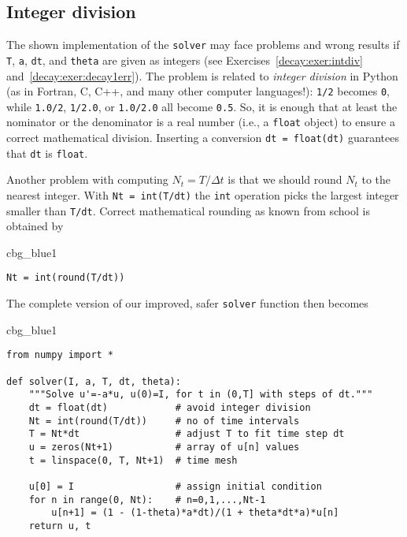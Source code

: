\documentclass[graybox,sectrefs,envcountresetchap,open=right,final]{svmonodo}
\newenvironment{_cod_tight}[1]{
   \def\FrameCommand{\colorbox{#1}}
   \FrameRule0.6pt\MakeFramed {\FrameRestore}\vskip3mm}
   {\vskip0mm\endMakeFramed}
\newenvironment{cod}[1]{
\bgroup\rmfamily
\fboxsep=0mm\relax
\begin{_cod_tight}{#1}
\list{}{\parsep=-2mm\parskip=0mm\topsep=0pt\leftmargin=2mm
\rightmargin=2\leftmargin\leftmargin=4pt\relax}
\item\relax}
{\endlist\end{_cod_tight}\egroup}
\begin{document}
\subsection{Integer division}
\label{decay:py2}

The shown implementation of the \texttt{solver} may face problems and
wrong results if \texttt{T}, \texttt{a}, \texttt{dt}, and \texttt{theta} are given as integers
(see Exercises~\ref{decay:exer:intdiv} and~\ref{decay:exer:decay1err}).
The problem is related to \emph{integer division} in Python (as
in Fortran, C, C++, and many other computer languages!): \texttt{1/2} becomes \texttt{0},
while \texttt{1.0/2}, \texttt{1/2.0}, or \texttt{1.0/2.0} all become \texttt{0.5}. So, it is enough
that at least the nominator or the denominator is a real number
(i.e., a \texttt{float} object)
to ensure a correct mathematical division. Inserting
a conversion \texttt{dt = float(dt)}
guarantees that \texttt{dt} is
\texttt{float}.

Another problem with computing $N_t=T/\Delta t$ is that we should
round $N_t$ to the nearest integer. With \texttt{Nt = int(T/dt)} the \texttt{int}
operation picks the largest integer smaller than \texttt{T/dt}. Correct
mathematical rounding as known from school is obtained by
\begin{cod}{cbg_blue1}\begin{Verbatim}[numbers=none,fontsize=\fontsize{9pt}{9pt},baselinestretch=0.95,xleftmargin=2mm]
Nt = int(round(T/dt))
\end{Verbatim}
\end{cod}
\noindent
The complete version of our improved, safer \texttt{solver} function then becomes

\begin{cod}{cbg_blue1}\begin{Verbatim}[numbers=none,fontsize=\fontsize{9pt}{9pt},baselinestretch=0.95,xleftmargin=2mm]
from numpy import *

def solver(I, a, T, dt, theta):
    """Solve u'=-a*u, u(0)=I, for t in (0,T] with steps of dt."""
    dt = float(dt)            # avoid integer division
    Nt = int(round(T/dt))     # no of time intervals
    T = Nt*dt                 # adjust T to fit time step dt
    u = zeros(Nt+1)           # array of u[n] values
    t = linspace(0, T, Nt+1)  # time mesh

    u[0] = I                  # assign initial condition
    for n in range(0, Nt):    # n=0,1,...,Nt-1
        u[n+1] = (1 - (1-theta)*a*dt)/(1 + theta*dt*a)*u[n]
    return u, t
\end{Verbatim}
\end{cod}
\noindent
\end{document}
